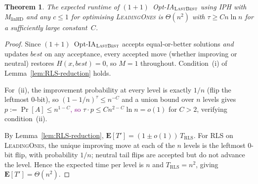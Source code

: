 \documentclass[lettersize,journal]{IEEEtran}
\newcommand{\rerev}[1]{\textcolor{purple}{#1}}
\newcommand{\linHD}{M$_{\text{linHD}}$}
\newcommand{\IPHfcm}{IPH}
\newcommand{\lastBest}{$(1+1)$~Opt-IA$_{\textsc{LastBest}}$}
\newtheorem{theorem}{Theorem}
\begin{document}
\begin{theorem}\label{thm:LBleadingones}
The expected runtime of \lastBest{} using \IPHfcm{} with \linHD{} and any
$c\leq 1$ for optimising \textsc{LeadingOnes} is $\Theta(n^2)$ with
$\tau\geq Cn\ln n$ for a sufficiently large constant~$C$.
\end{theorem}
\begin{proof}
Since \lastBest{} accepts equal-or-better solutions \emph{and} updates
$\mathit{best}$ on any acceptance, every accepted move (whether improving or
neutral) restores $H(x,\mathit{best})=0$, so $M=1$ throughout.
Condition~(i) of Lemma~\ref{lem:RLS-reduction} holds.

For~(ii), the improvement probability at every level is exactly $1/n$
(flip the leftmost $0$-bit), so $(1-1/n)^\tau\leq n^{-C}$
and a union bound over $n$ levels gives $p:=\Pr[A]\leq n^{1-C}$\rerev{, so}
$\tau\cdot p\leq Cn^{2-C}\ln n=o(1)$ for $C>2$, verifying
condition~(ii).

By Lemma~\ref{lem:RLS-reduction},
$\mathbf{E}[T']=(1\pm o(1))\,T_{\mathrm{RLS}}$.
For RLS on \textsc{LeadingOnes}, the unique improving move at each of the $n$
levels is the leftmost $0$-bit flip, with probability $1/n$; neutral tail
flips are accepted but do not advance the level.  Hence the expected time per
level is $n$ and $T_{\mathrm{RLS}}=n^2$, giving $\mathbf{E}[T']=\Theta(n^2)$.
\end{proof}
\end{document}

